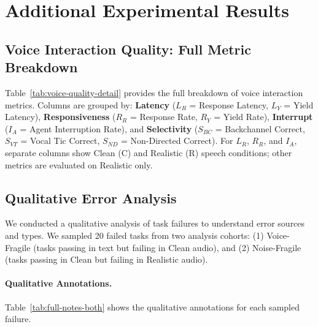 \section{Additional Experimental Results}
\label{app:results}

\subsection{Voice Interaction Quality: Full Metric Breakdown}
\label{app:voice-metrics-detail}

Table~\ref{tab:voice-quality-detail} provides the full breakdown of voice interaction metrics. Columns are grouped by: \textbf{Latency} ($L_R$ = Response Latency, $L_Y$ = Yield Latency), \textbf{Responsiveness} ($R_R$ = Response Rate, $R_Y$ = Yield Rate), \textbf{Interrupt} ($I_A$ = Agent Interruption Rate), and \textbf{Selectivity} ($S_{BC}$ = Backchannel Correct, $S_{VT}$ = Vocal Tic Correct, $S_{ND}$ = Non-Directed Correct). For $L_R$, $R_R$, and $I_A$, separate columns show Clean (C) and Realistic (R) speech conditions; other metrics are evaluated on Realistic only.

\begin{table}[h]
\caption{Voice interaction quality metrics---full breakdown (Realistic condition). \textbf{Bold} indicates best per domain. $\uparrow$ = higher is better, $\downarrow$ = lower is better.}
\label{tab:voice-quality-detail}
\centering
\begin{small}
\resizebox{\textwidth}{!}{%

}
\end{small}
\end{table}


\subsection{Qualitative Error Analysis}
\label{app:qualitative-analysis}

We conducted a qualitative analysis of task failures to understand error sources and types. We sampled 20 failed tasks from two analysis cohorts: (1) Voice-Fragile (tasks passing in text but failing in Clean audio), and (2) Noise-Fragile (tasks passing in Clean but failing in Realistic audio).

\paragraph{Qualitative Annotations.}
Table~\ref{tab:full-notes-both} shows the qualitative annotations for each sampled failure.

